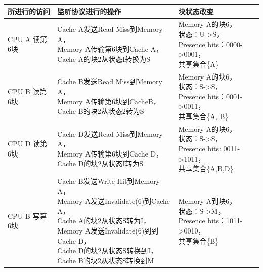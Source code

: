 \documentclass{ctexart}
\makeatletter
\newcommand{\tabincell}[2]{\begin{tabular}{@{}#1@{}}#2\end{tabular}}
\makeatother
\begin{document}
\begin{enumerate}
\begin{longtable}{|l|l|l|}
        \endlastfoot
        \hline
        所进行的访问      & 监听协议进行的操作                                                                                                                                               & 块状态改变                                                                                                                                                               \\ \hline
        CPU A 读第6块  & \tabincell{l}{Cache A发送Read Miss到Memory A，\\Memory A传输第6块到Cache A，\\Cache A的块2从状态I转换为S}                                                                                    & \tabincell{l}{Memory A的块6，\\状态：U-\textgreater{}S，\\Presence bits：0000-\textgreater{}0001，\\共享集合\{A\}}                                                                                     \\ \hline
        CPU B 读第6块  & \tabincell{l}{Cache B发送Read Miss到Memory A，\\Memory A传输第6块到CacheB，\\Cache B的块2从状态2转为S}                                                                                      & \tabincell{l}{Memory A的块6，\\状态：S-\textgreater{}S，\\Presence bits：0001-\textgreater{}0011，\\共享集合\{A, B\}}                                                                                  \\ \hline
        CPU D 读第6块  & \tabincell{l}{Cache D发送Read Miss到Memory A，\\Memory A传输第6块到Cache D，\\Cache D的块2从状态I转为S}                                                                                      & \tabincell{l}{Memory A的块6，\\状态：S-\textgreater{}S，\\Presence bits: 0011-\textgreater{}1011，\\共享集合\{A,B,D\}}                                                                                \\ \hline
        CPU B 写第6块  & \tabincell{l}{Cache B发送Write Hit到Memory A，\\Memory A发送Invalidate(6)到Cache A，\\Cache A的块2从状态S转为I，\\Memory A发送Invalidate(6)到到Cache D，\\Cache D的块2从状态S转换到I，\\Cache B的块2从状态S转换到M}     & \tabincell{l}{Memory A到块6，\\状态：S-\textgreater{}M，\\Presence bits：1011-\textgreater{}0010，\\共享集合\{B\}}                                                                                     \\ \hline

\end{longtable}
\end{enumerate}
\end{document}
